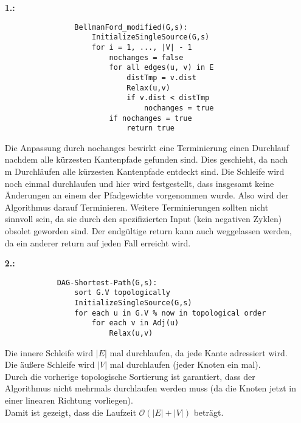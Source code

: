 \documentclass[a4paper,11pt,fleqn]{scrartcl}
\title{\titleinfo}
\author{\authorinfo}
\begin{document}
	\maketitle
	\begin{enumerate}
		\item[\textbf{1.:}] \quad \\
			\begin{verbatim}
				BellmanFord_modified(G,s):
				    InitializeSingleSource(G,s)
				    for i = 1, ..., |V| - 1
				        nochanges = false
				        for all edges(u, v) in E
				            distTmp = v.dist
				            Relax(u,v)
				            if v.dist < distTmp
				                nochanges = true
				        if nochanges = true
				            return true
			\end{verbatim}
		
			Die Anpassung durch nochanges bewirkt eine Terminierung einen Durchlauf nachdem alle kürzesten
			Kantenpfade gefunden sind. Dies geschieht, da nach m Durchläufen alle kürzesten Kantenpfade entdeckt
			sind. Die Schleife wird noch einmal durchlaufen und hier wird festgestellt, dass insgesamt keine
			Änderungen an einem der Pfadgewichte vorgenommen wurde. Also wird der Algorithmus darauf Terminieren.
			Weitere Terminierungen sollten nicht sinnvoll sein, da sie durch den spezifizierten Input (kein
			negativen Zyklen) obsolet geworden sind. Der endgültige return kann auch weggelassen werden, da ein 	
			anderer return auf jeden Fall erreicht wird.
		\item[\textbf{2.:}] \quad \\
			\begin{verbatim}
			DAG-Shortest-Path(G,s):
			    sort G.V topologically
			    InitializeSingleSource(G,s)
			    for each u in G.V % now in topological order
			        for each v in Adj(u)
			            Relax(u,v)
			\end{verbatim}				
			Die innere Schleife wird \(|E|\) mal durchlaufen, da jede Kante adressiert wird. \\
			Die äußere Schleife wird \(|V|\) mal durchlaufen (jeder Knoten ein mal). \\
			Durch die vorherige topologische Sortierung ist garantiert, dass der Algorithmus nicht mehrmals
			durchlaufen werden muss (da die Knoten jetzt in einer linearen Richtung vorliegen). \\
			Damit ist gezeigt, dass die Laufzeit \(\mathcal{O}(|E|+|V|)\) beträgt.
			

\end{enumerate}
\end{document}
